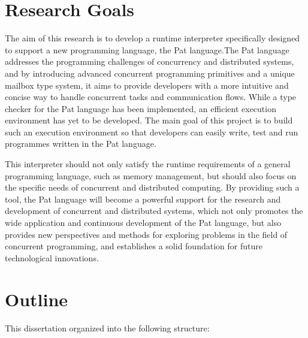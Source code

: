 \documentclass{l4proj}
\begin{document}
\section{Research Goals}

The aim of this research is to develop a runtime interpreter specifically designed to support a new programming language, the Pat language.The Pat language addresses the programming challenges of concurrency and distributed systems, and by introducing advanced concurrent programming primitives and a unique mailbox type system, it aims to provide developers with a more intuitive and concise way to handle concurrent tasks and communication flows. While a type checker for the Pat language has been implemented, an efficient execution environment has yet to be developed. The main goal of this project is to build such an execution environment so that developers can easily write, test and run programmes written in the Pat language.

This interpreter should not only satisfy the runtime requirements of a general programming language, such as memory management, but should also focus on the specific needs of concurrent and distributed computing. By providing such a tool, the Pat language will become a powerful support for the research and development of concurrent and distributed systems, which not only promotes the wide application and continuous development of the Pat language, but also provides new perspectives and methods for exploring problems in the field of concurrent programming, and establishes a solid foundation for future technological innovations.

\section{Outline}
This dissertation organized into the following structure:
\end{document}

